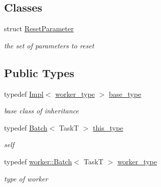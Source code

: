 \subsection*{Classes}
\begin{DoxyCompactItemize}
\item 
struct \hyperlink{structhryky_1_1task_1_1distributor_1_1_batch_1_1_reset_parameter}{Reset\-Parameter}
\begin{DoxyCompactList}\small\item\em the set of parameters to reset \end{DoxyCompactList}\end{DoxyCompactItemize}
\subsection*{Public Types}
\begin{DoxyCompactItemize}
\item 
\hypertarget{classhryky_1_1task_1_1distributor_1_1_batch_a359f221fcab163ce25db74f1695f9c1b}{typedef \hyperlink{classhryky_1_1task_1_1distributor_1_1_impl}{Impl}$<$ \hyperlink{classhryky_1_1task_1_1worker_1_1_base}{worker\-\_\-type} $>$ \hyperlink{classhryky_1_1task_1_1distributor_1_1_batch_a359f221fcab163ce25db74f1695f9c1b}{base\-\_\-type}}\label{classhryky_1_1task_1_1distributor_1_1_batch_a359f221fcab163ce25db74f1695f9c1b}

\begin{DoxyCompactList}\small\item\em base class of inheritance \end{DoxyCompactList}\item 
\hypertarget{classhryky_1_1task_1_1distributor_1_1_batch_ab5d613652725c425a5dbc75338a8c5f0}{typedef \hyperlink{classhryky_1_1task_1_1distributor_1_1_batch}{Batch}$<$ Task\-T $>$ \hyperlink{classhryky_1_1task_1_1distributor_1_1_batch_ab5d613652725c425a5dbc75338a8c5f0}{this\-\_\-type}}\label{classhryky_1_1task_1_1distributor_1_1_batch_ab5d613652725c425a5dbc75338a8c5f0}

\begin{DoxyCompactList}\small\item\em self \end{DoxyCompactList}\item 
\hypertarget{classhryky_1_1task_1_1distributor_1_1_batch_adb73470606a9b6fcb8aa968604ccafd4}{typedef \hyperlink{classhryky_1_1task_1_1worker_1_1_batch}{worker\-::\-Batch}$<$ Task\-T $>$ \hyperlink{classhryky_1_1task_1_1distributor_1_1_batch_adb73470606a9b6fcb8aa968604ccafd4}{worker\-\_\-type}}\label{classhryky_1_1task_1_1distributor_1_1_batch_adb73470606a9b6fcb8aa968604ccafd4}

\begin{DoxyCompactList}\small\item\em type of worker \end{DoxyCompactList}\end{DoxyCompactItemize}
